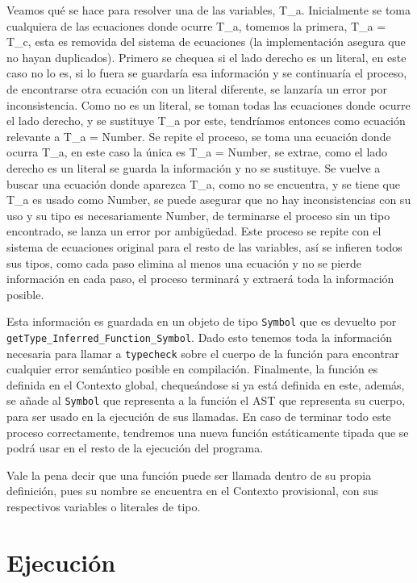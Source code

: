 \documentclass{article}
\begin{document}
Veamos qué se hace para resolver una de las variables, T\_a. Inicialmente se toma cualquiera de las ecuaciones donde ocurre T\_a, tomemos la primera, T\_a = T\_c, esta es removida del sistema de ecuaciones (la implementación asegura que no hayan duplicados).  Primero se chequea si el lado derecho es un literal, en este caso no lo es, si lo fuera se guardaría esa información y se continuaría el proceso, de encontrarse otra ecuación con un literal diferente, se lanzaría un error por inconsistencia. Como no es un literal, se toman todas las ecuaciones donde ocurre el lado derecho, y se sustituye T\_a por este, tendríamos entonces como ecuación relevante a T\_a = Number. Se repite el proceso, se toma una ecuación donde ocurra T\_a, en este caso la única es T\_a = Number, se extrae, como el lado derecho es un literal se guarda la información y no se sustituye. Se vuelve a buscar una ecuación donde aparezca T\_a, como no se encuentra, y se tiene que T\_a es usado como Number, se puede asegurar que no hay inconsistencias con su uso y su tipo es necesariamente Number, de terminarse el proceso sin un tipo encontrado, se lanza un error por ambigüedad. Este proceso se repite con el sistema de ecuaciones original para el resto de las variables, así se infieren todos sus tipos, como cada paso elimina al menos una ecuación y no se pierde información en cada paso, el proceso terminará y extraerá toda la información posible.

Esta información es guardada en un objeto de tipo \texttt{Symbol} que es devuelto por \texttt{getType\_Inferred\_Function\_Symbol}. Dado esto tenemos toda la información necesaria para llamar a \texttt{typecheck} sobre el cuerpo de la función para encontrar cualquier error semántico posible en compilación. Finalmente, la función es definida en el Contexto global, chequeándose si ya está definida en este, además, se añade al \texttt{Symbol} que representa a la función el AST que representa su cuerpo, para ser usado en la ejecución de sus llamadas. En caso de terminar todo este proceso correctamente, tendremos una nueva función estáticamente tipada que se podrá usar en el resto de la ejecución del programa.

Vale la pena decir que una función puede ser llamada dentro de su propia definición, pues su nombre se encuentra en el Contexto provisional, con sus respectivos variables o literales de tipo.

\newpage

\section{Ejecución}
\end{document}
